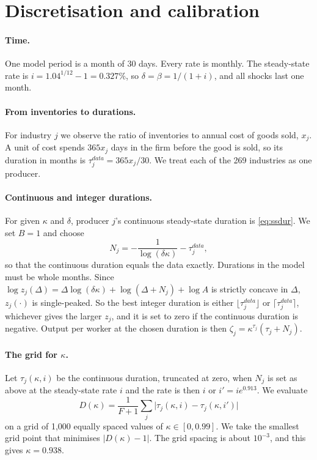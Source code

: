 \documentclass[11pt]{article}
\theoremstyle{definition}
\begin{document}
\section{Discretisation and calibration}\label{app:discrete}

\paragraph{Time.} One model period is a month of 30 days. Every rate is monthly. The steady-state rate is
$i=1.04^{1/12}-1=0.327\%$, so $\delta=\beta=1/(1+i)$, and all shocks last one month.

\paragraph{From inventories to durations.} For industry $j$ we observe the ratio of inventories to
annual cost of goods sold, $x_j$. A unit of cost spends $365x_j$ days in the firm before the good is
sold, so its duration in months is $\tau_j^{data}=365x_j/30$. We treat each of the 269 industries as one
producer.

\paragraph{Continuous and integer durations.} For given $\kappa$ and $\delta$, producer $j$'s continuous
steady-state duration is \eqref{eq:ssdur}. We set $B=1$ and choose
\[
  N_j=-\frac{1}{\log(\delta\kappa)}-\tau_j^{data},
\]
so that the continuous duration equals the data exactly. Durations in the model must be whole months.
Since $\log z_j(\Delta)=\Delta\log(\delta\kappa)+\log(\Delta+N_j)+\log A$ is strictly concave in $\Delta$,
$z_j(\cdot)$ is single-peaked. So the best integer duration is either $\lfloor\tau_j^{data}\rfloor$ or
$\lceil\tau_j^{data}\rceil$, whichever gives the larger $z_j$, and it is set to zero if the continuous
duration is negative. Output per worker at the chosen duration is then
$\zeta_j=\kappa^{\tau_j}(\tau_j+N_j)$.

\paragraph{The grid for $\kappa$.} Let $\tau_j(\kappa,i)$ be the continuous duration, truncated at zero,
when $N_j$ is set as above at the steady-state rate $i$ and the rate is then $i$ or $i'=ie^{0.913}$. We
evaluate
\[
  D(\kappa)=\frac{1}{F+1}\sum_j\bigl|\tau_j(\kappa,i)-\tau_j(\kappa,i')\bigr|
\]
on a grid of 1{,}000 equally spaced values of $\kappa\in[0,0.99]$. We take the smallest grid point that
minimises $|D(\kappa)-1|$. The grid spacing is about $10^{-3}$, and this gives $\kappa=0.938$.
\end{document}
